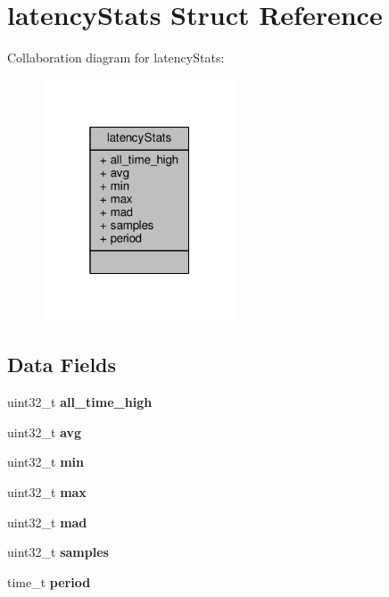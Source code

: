 \hypertarget{structlatencyStats}{}\section{latency\+Stats Struct Reference}
\label{structlatencyStats}


Collaboration diagram for latency\+Stats\+:\nopagebreak
\begin{figure}[H]
\begin{center}
\leavevmode
\includegraphics[width=163pt]{structlatencyStats__coll__graph}
\end{center}
\end{figure}
\subsection*{Data Fields}
\begin{DoxyCompactItemize}
\item 
\mbox{\label{structlatencyStats_a1ce73f3dd6b3787f6ba4f4bd883848ef}} 
uint32\+\_\+t {\bfseries all\+\_\+time\+\_\+high}
\item 
\mbox{\label{structlatencyStats_afe95b3cbb8b32557b16675a19a40aea4}} 
uint32\+\_\+t {\bfseries avg}
\item 
\mbox{\label{structlatencyStats_ade83359eab0f2113a088512023179e0d}} 
uint32\+\_\+t {\bfseries min}
\item 
\mbox{\label{structlatencyStats_aea39ad33215568e3c8b5b3b0439a1016}} 
uint32\+\_\+t {\bfseries max}
\item 
\mbox{\label{structlatencyStats_ae915b37631c7aed2c39e02411bcf74fd}} 
uint32\+\_\+t {\bfseries mad}
\item 
\mbox{\label{structlatencyStats_a0d590a2796ed6876cc0f4b19bc7d44df}} 
uint32\+\_\+t {\bfseries samples}
\item 
\mbox{\label{structlatencyStats_aa5b82dd0fbe1379bb63d3fd7f601be9b}} 
time\+\_\+t {\bfseries period}
\end{DoxyCompactItemize}



